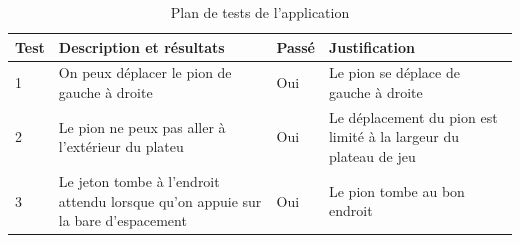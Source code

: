 \begin{table}[H]
    \centering
    \caption{Plan de tests de l'application}
    \begin{tabular}{p{0.25in}p{2.5in}p{0.5in}p{2.5in}}
        \hline
        \bfseries Test & \bfseries Description et résultats & \bfseries Passé & \bfseries Justification \\
        \hline\hline
        1 & On peux déplacer le pion de gauche à droite & Oui & Le pion se déplace de gauche à droite \\
        2 & Le pion ne peux pas aller à l'extérieur du plateu & Oui & Le déplacement du pion est limité à la largeur du plateau de jeu \\
        3 & Le jeton tombe à l'endroit attendu lorsque qu'on appuie sur la bare d'espacement & Oui & Le pion tombe au bon endroit \\
        \hline
    \end{tabular}
\end{table}
